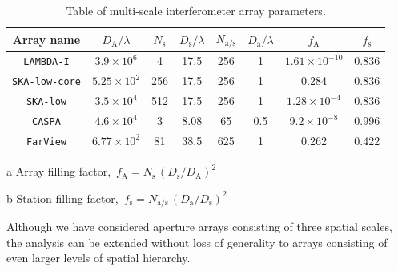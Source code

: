 \documentclass[
  journal=pasa,
  manuscript=article-type,
  year=2020,
  volume=37,
]{cup-journal}
\begin{document}
\begin{table}[htb!]
\normalsize
\begin{threeparttable}
\caption{Table of multi-scale interferometer array parameters.}
\label{tab:array_params}
\begin{tabular}{cccccc|cc}
\toprule
\headrow Array name & $D_\textrm{A}/\lambda$ & $N_\textrm{s}$ & $D_\textrm{s}/\lambda$ & $N_\textrm{a/s}$ & $D_\textrm{a}/\lambda$ & $f_\textrm{A}$\tnote{a} & $f_\textrm{s}$\tnote{b} \\
\midrule
\texttt{LAMBDA-I} & $3.9\times 10^6$ & 4 & 17.5 & 256 & 1 & $1.61\times 10^{-10}$ & 0.836 \\ 
\texttt{SKA-low-core} & $5.25\times 10^{2}$ & 256 & 17.5 & 256 & 1 & 0.284 & 0.836 \\ 
\texttt{SKA-low} & $3.5\times 10^4$ & 512 & 17.5 & 256 & 1 & $1.28\times 10^{-4}$ & 0.836 \\ 
\texttt{CASPA} & $4.6\times 10^4$ & 3 & 8.08 & 65 & 0.5 & $9.2\times 10^{-8}$ & 0.996 \\ 
\texttt{FarView} & $6.77\times 10^2$ & 81 & 38.5 & 625 & 1 & 0.262 & 0.422 \\ 
\bottomrule
\end{tabular}
\begin{tablenotes}[hang]
\item[a]Array filling factor, $\,f_\textrm{A}=N_\textrm{s}\,(D_\textrm{s}/D_\textrm{A})^2$
\item[b]Station filling factor, $\,f_\textrm{s}=N_\textrm{a/s}\,(D_\textrm{a}/D_\textrm{s})^2$
\end{tablenotes}
\end{threeparttable}
\end{table}

Although we have considered aperture arrays consisting of three spatial scales, the analysis can be extended without loss of generality to arrays consisting of even larger levels of spatial hierarchy. 
\end{document}
